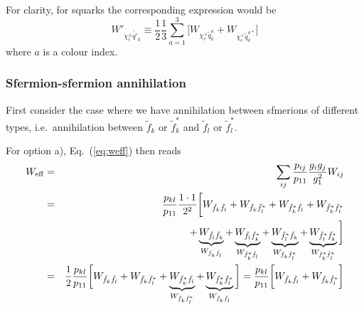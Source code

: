 For clarity, for squarks the corresponding expression would be
\begin{equation}
    W'_{\chi_{c}^\pm \tilde{q'}_{k}} \equiv
    \frac{1}{2} \frac{1}{3}\sum_{a=1}^3 \bigg[ 
    W_{\chi_{c}^+ \tilde{q}_{k}^a} + 
    W_{\chi_{c}^+ \tilde{q}_{k}^{a*}}
    \bigg] 
\end{equation}
where $a$ is a colour index.


\subsubsection{Sfermion-sfermion annihilation}

First consider the case where we have annihilation between sfmerions 
of different types, i.e.\ annihilation between $\tilde{f}_{k}$ or 
$\tilde{f}_{k}^{*}$ and $\tilde{f}_{l}$ or $\tilde{f}_{l}^{*}$.

For option a), Eq.~(\ref{eq:weff}) then reads
\begin{eqnarray}
    W_{\rm eff} & = & \sum_{ij}\frac{p_{ij}}{p_{11}} 
    \frac{g_{i}g_{j}}{g_{1}^2} W_{ij}
    \nonumber \\
    & = & \frac{p_{kl}}{p_{11}} \frac{1 \cdot 1}{2^2}
    \bigg[ 
    W_{\tilde{f}_{k} \tilde{f}_{l}} +
    W_{\tilde{f}_{k} \tilde{f}_{l}^{*}} +
    W_{\tilde{f}_{k}^{*} \tilde{f}_{l}} +
    W_{\tilde{f}_{k}^{*} \tilde{f}_{l}^{*}} \nonumber \\
    & & +
    \underbrace{W_{\tilde{f}_{l} \tilde{f}_{k}}}_
       {W_{\tilde{f}_{k} \tilde{f}_{l}}} +
    \underbrace{W_{\tilde{f}_{l} \tilde{f}_{k}^{*}}}_
       {W_{\tilde{f}_{k}^{*} \tilde{f}_{l}}} +
    \underbrace{W_{\tilde{f}_{l}^{*} \tilde{f}_{k}}}_
       {W_{\tilde{f}_{k} \tilde{f}_{l}^{*}}} +
    \underbrace{W_{\tilde{f}_{l}^{*} \tilde{f}_{k}^{*}}}_
       {W_{\tilde{f}_{k}^{*} \tilde{f}_{l}^{*}}}
    \bigg]  \nonumber \\
    & = &
    \frac{1}{2} \frac{p_{kl}}{p_{11}}
    \bigg[ 
    W_{\tilde{f}_{k} \tilde{f}_{l}} +
    W_{\tilde{f}_{k} \tilde{f}_{l}^{*}} +
    \underbrace{W_{\tilde{f}_{k}^{*} \tilde{f}_{l}}}_
        {W_{\tilde{f}_{k} \tilde{f}_{l}^{*}}} +
    \underbrace{W_{\tilde{f}_{k}^{*} \tilde{f}_{l}^{*}}}_
        {W_{\tilde{f}_{k} \tilde{f}_{l}}}
    \bigg] 
    = \frac{p_{kl}}{p_{11}}
    \bigg[ 
    W_{\tilde{f}_{k} \tilde{f}_{l}} +
    W_{\tilde{f}_{k} \tilde{f}_{l}^{*}}
    \bigg] \label{eq:weffsfsf-a}
\end{eqnarray}    

